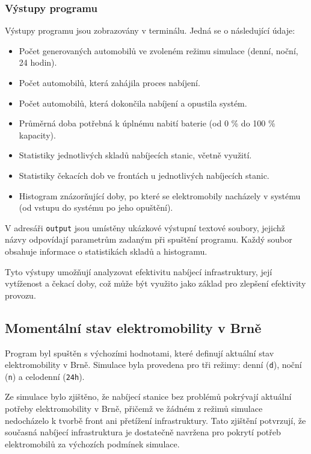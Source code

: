 \documentclass[a4paper,11pt]{article}
\begin{document}
\subsubsection{Výstupy programu}

Výstupy programu jsou zobrazovány v terminálu. Jedná se o následující údaje:
\begin{itemize}
    \item Počet generovaných automobilů ve zvoleném režimu simulace (denní, noční, 24 hodin).
    \item Počet automobilů, která zahájila proces nabíjení.
    \item Počet automobilů, která dokončila nabíjení a opustila systém.
    \item Průměrná doba potřebná k úplnému nabití baterie (od 0 \% do 100 \% kapacity).
    \item Statistiky jednotlivých skladů nabíjecích stanic, včetně využití.
    \item Statistiky čekacích dob ve frontách u jednotlivých nabíjecích stanic.
    \item Histogram znázorňující doby, po které se elektromobily nacházely v systému (od vstupu do systému po jeho opuštění).
\end{itemize}

V adresáři \texttt{output} jsou umístěny ukázkové výstupní textové soubory, jejichž názvy odpovídají parametrům zadaným při spuštění programu. Každý soubor obsahuje informace o statistikách skladů a histogramu.

Tyto výstupy umožňují analyzovat efektivitu nabíjecí infrastruktury, její vytíženost a čekací doby, což může být využito jako základ pro zlepšení efektivity provozu.

\subsection{Momentální stav elektromobility v Brně}
Program byl spuštěn s výchozími hodnotami, které definují aktuální stav elektromobility v Brně. Simulace byla provedena pro tři režimy: denní (\texttt{d}), noční (\texttt{n}) a celodenní (\texttt{24h}). 

Ze simulace bylo zjištěno, že nabíjecí stanice bez problémů pokrývají aktuální potřeby elektromobility v Brně, přičemž ve žádném z režimů simulace nedocházelo k tvorbě front ani přetížení infrastruktury. Tato zjištění potvrzují, že současná nabíjecí infrastruktura je dostatečně navržena pro pokrytí potřeb elektromobilů za výchozích podmínek simulace.
\end{document}
